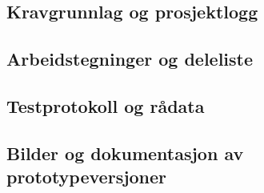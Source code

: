 \subsection{Kravgrunnlag og prosjektlogg}
\subsection{Arbeidstegninger og deleliste}
\subsection{Testprotokoll og rådata}
\subsection{Bilder og dokumentasjon av prototypeversjoner}
